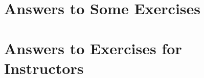
\chapter{Answers to Some Exercises}

\showallanswersS




\chapter{Answers to Exercises for Instructors}

\showallanswersI
